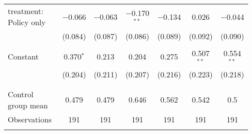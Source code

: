 \begin{tabular}{@{\extracolsep{5pt}}lcccccc}
 treatment: Policy only & $-$0.066 & $-$0.063 & $-$0.170$^{**}$ & $-$0.134 & 0.026 & $-$0.044 \\ 
  & (0.084) & (0.087) & (0.086) & (0.089) & (0.092) & (0.090) \\ 
  & & & & & & \\ 
 Constant & 0.370$^{*}$ & 0.213 & 0.204 & 0.275 & 0.507$^{**}$ & 0.554$^{**}$ \\ 
  & (0.204) & (0.211) & (0.207) & (0.216) & (0.223) & (0.218) \\ 
  & & & & & & \\ 
\hline \\[-1.8ex] 
Control group mean & 0.479 & 0.479 & 0.646 & 0.562 & 0.542 & 0.5 \\ 
Observations & 191 & 191 & 191 & 191 & 191 & 191 \\ 
\hline 
\hline \\[-1.8ex] 
\end{tabular} 
